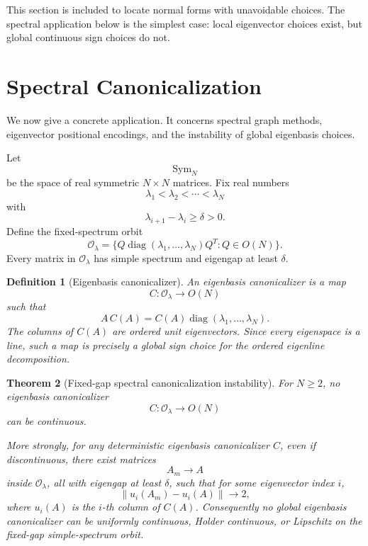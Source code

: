 \documentclass[11pt]{article}
\newtheorem{theorem}{Theorem}[section]
\newtheorem{definition}[theorem]{Definition}
\DeclareMathOperator{\Sym}{Sym}
\begin{document}
This section is included to locate normal forms with unavoidable choices. The spectral application below is the simplest case: local eigenvector choices exist, but global continuous sign choices do not.

\section{Spectral Canonicalization}

We now give a concrete application. It concerns spectral graph methods, eigenvector positional encodings, and the instability of global eigenbasis choices.

Let
\[
\Sym_N
\]
be the space of real symmetric \(N\times N\) matrices. Fix real numbers
\[
\lambda_1<\lambda_2<\cdots<\lambda_N
\]
with
\[
\lambda_{i+1}-\lambda_i\geq\delta>0.
\]
Define the fixed-spectrum orbit
\[
\mathcal O_\lambda
=
\{Q\operatorname{diag}(\lambda_1,\ldots,\lambda_N)Q^T:Q\in O(N)\}.
\]
Every matrix in \(\mathcal O_\lambda\) has simple spectrum and eigengap at least \(\delta\).

\begin{definition}[Eigenbasis canonicalizer]
An eigenbasis canonicalizer is a map
\[
C:\mathcal O_\lambda\to O(N)
\]
such that
\[
A\,C(A)=C(A)\operatorname{diag}(\lambda_1,\ldots,\lambda_N).
\]
The columns of \(C(A)\) are ordered unit eigenvectors. Since every eigenspace is a line, such a map is precisely a global sign choice for the ordered eigenline decomposition.
\end{definition}

\begin{theorem}[Fixed-gap spectral canonicalization instability]
For \(N\geq2\), no eigenbasis canonicalizer
\[
C:\mathcal O_\lambda\to O(N)
\]
can be continuous.

More strongly, for any deterministic eigenbasis canonicalizer \(C\), even if discontinuous, there exist matrices
\[
A_m\to A
\]
inside \(\mathcal O_\lambda\), all with eigengap at least \(\delta\), such that for some eigenvector index \(i\),
\[
\|u_i(A_m)-u_i(A)\|\to 2,
\]
where \(u_i(A)\) is the \(i\)-th column of \(C(A)\). Consequently no global eigenbasis canonicalizer can be uniformly continuous, Holder continuous, or Lipschitz on the fixed-gap simple-spectrum orbit.
\end{theorem}
\end{document}
